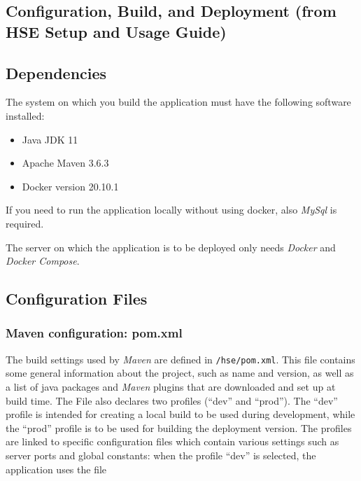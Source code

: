 \documentclass[a4paper]{usiinfbachelorproject}
\begin{document}
\newpage

\begin{appendices}

        \section{Configuration, Build, and Deployment (from HSE Setup and Usage Guide)}
        \label{sec:deployment}

        \subsection{Dependencies}

        The system on which you build the application must have the following software installed:

        \begin{itemize}

        \item Java JDK 11

        \item Apache Maven 3.6.3

        \item Docker version 20.10.1

        \end{itemize}

        If you need to run the application locally without using docker, also \emph{MySql} is required. 

        The server on which the application is to be deployed only needs \emph{Docker} and \emph{Docker Compose}.

        \subsection{Configuration Files}

        \subsubsection{Maven configuration: pom.xml}

        The build settings used by \emph{Maven} are defined in \texttt{/hse/pom.xml}. This file contains some general information
        about the project, such as name and version, as well as a list of java packages and \emph{Maven} plugins that are 
        downloaded and set up at build time. The File also declares two profiles (``dev'' and ``prod''). The ``dev'' profile 
        is intended for creating a local build to be used during development, while the ``prod'' profile is to be used for building the deployment version.
        The profiles are linked to specific configuration files which contain various settings such as server ports and global
        constants: when the profile ``dev'' is selected, the application uses the file 


\end{appendices}
\end{document}
